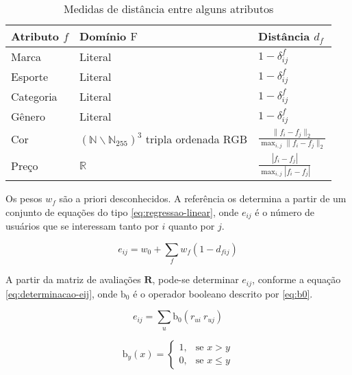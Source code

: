 \begin{table}[hp]
\begin{center}
    \caption{Medidas de distância entre alguns atributos}
    \label{tab:medidas-distancia}
    \begin{tabular}{  | >{\arraybackslash} m{3cm} | >{\arraybackslash} m{3cm} | >{\centering\arraybackslash} m{3cm} | } 
    \hline
    \textbf{Atributo} $f$ & \textbf{Domínio} $\mathrm{F}$ & \textbf{Distância} $d_f$ \\ \hline
    Marca & Literal & $1-\delta^f_{ij}$ \\ \hline    
    Esporte & Literal & $1-\delta^f_{ij}$ \\ \hline
    Categoria & Literal & $1-\delta^f_{ij}$ \\ \hline            
    Gênero & Literal & $1-\delta^f_{ij}$ \\ \hline            
    Cor & $\left(\mathbb{N}\backslash \mathbb{N}_{255}\right)^3$  tripla ordenada RGB & $ \frac{\lVert f_i-f_j \rVert_2}{\max_{i,j}{\lVert f_i-f_j \rVert_2}} $ \\ \hline
    Preço & $\mathbb{R}$ & $ \frac{\left| f_i-f_j \right|}{\max_{i,j}{\left| f_i-f_j \right|}} $ \\ \hline                
    \end{tabular}
\end{center}
\end{table}
 
Os pesos $w_f$ são a priori desconhecidos. A referência \cite{symeonidis2007feature} os determina a partir de um conjunto de equações do tipo \ref{eq:regressao-linear}, onde $e_{ij}$ é o número de usuários que se interessam tanto por $i$ quanto por $j$. 

\begin{equation}
\label{eq:regressao-linear} 
    e_{ij} = w_0 + \sum_{f}{w_{f} \left(1-d_{fij}\right)}
\end{equation} 

A partir da matriz de avaliações $\mathbf{R}$, pode-se determinar $e_{ij}$, conforme a equação \ref{eq:determinacao-eij}, onde $\mathrm{b_0}$ é o operador booleano descrito por \ref{eq:b0}.

\begin{equation}
\label{eq:determinacao-eij} 
    e_{ij} = \sum_{u}{\mathrm{b_0}\left(r_{ui} ~ r_{uj}\right)}
\end{equation} 

\begin{equation}
\label{eq:b0}
\mathrm{b}_y\left(x\right) = 
\begin{cases}
1, &\text{se }x>y \\
0, &\text{se }x\leq y
\end{cases} 
\end{equation}

